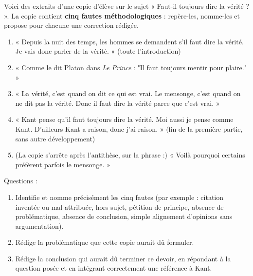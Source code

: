 \documentclass[11pt]{article}
\begin{document}
\begin{exercice}
Voici des extraits d'une copie d'élève sur le sujet « Faut-il toujours dire la vérité ? ». La copie contient \textbf{cinq fautes méthodologiques} : repère-les, nomme-les et propose pour chacune une correction rédigée.
\begin{enumerate}
\item « Depuis la nuit des temps, les hommes se demandent s'il faut dire la vérité. Je vais donc parler de la vérité. » (toute l'introduction)
\item « Comme le dit Platon dans \emph{Le Prince} : "Il faut toujours mentir pour plaire." »
\item « La vérité, c'est quand on dit ce qui est vrai. Le mensonge, c'est quand on ne dit pas la vérité. Donc il faut dire la vérité parce que c'est vrai. »
\item « Kant pense qu'il faut toujours dire la vérité. Moi aussi je pense comme Kant. D'ailleurs Kant a raison, donc j'ai raison. » (fin de la première partie, sans autre développement)
\item (La copie s'arrête après l'antithèse, sur la phrase :) « Voilà pourquoi certains préfèrent parfois le mensonge. »
\end{enumerate}
Questions :
\begin{enumerate}
\item Identifie et nomme précisément les cinq fautes (par exemple : citation inventée ou mal attribuée, hors-sujet, pétition de principe, absence de problématique, absence de conclusion, simple alignement d'opinions sans argumentation).
\item Rédige la problématique que cette copie aurait dû formuler.
\item Rédige la conclusion qui aurait dû terminer ce devoir, en répondant à la question posée et en intégrant correctement une référence à Kant.
\end{enumerate}
\end{exercice}
\end{document}

